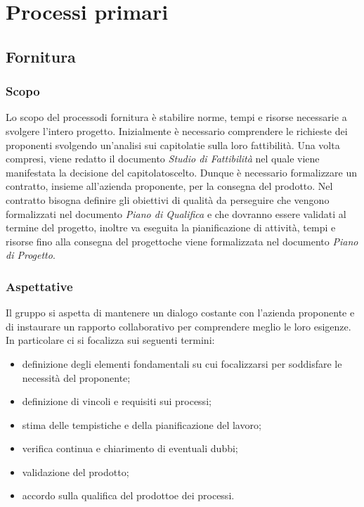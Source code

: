 \section{Processi primari}
	\subsection{Fornitura}
		\subsubsection{Scopo}
		Lo scopo del processo\glosp di fornitura è stabilire norme, tempi e risorse necessarie a svolgere l'intero progetto\glo.
		Inizialmente è necessario comprendere le richieste dei proponenti svolgendo un'analisi sui capitolati\glo e sulla loro fattibilità. Una volta compresi, viene redatto il documento \textit{Studio di Fattibilità} nel quale viene manifestata la decisione del capitolato\glosp scelto.
		Dunque è necessario formalizzare un contratto, insieme all'azienda proponente, per la consegna del prodotto\glo. Nel contratto bisogna definire gli obiettivi di qualità da perseguire che vengono formalizzati nel documento \textit{Piano di Qualifica} e che dovranno essere validati al termine del progetto, inoltre va eseguita la pianificazione di attività, tempi e risorse fino alla consegna del progetto\glosp che viene formalizzata nel documento \textit{Piano di Progetto}.
		\subsubsection{Aspettative}
		Il gruppo si aspetta di mantenere un dialogo costante con l'azienda proponente e di instaurare un rapporto collaborativo per comprendere meglio le loro esigenze. In particolare ci si focalizza sui seguenti termini:
		\begin{itemize}
			\item definizione degli elementi fondamentali su cui focalizzarsi per soddisfare le necessità del proponente;
			\item definizione di vincoli e requisiti sui processi\glo;
			\item stima delle tempistiche e della pianificazione del lavoro;
			\item verifica continua e chiarimento di eventuali dubbi;
			\item validazione del prodotto\glo;
			\item accordo sulla qualifica del prodotto\glosp e dei processi\glo.
		\end{itemize}
